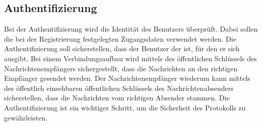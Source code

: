 \subsection{Authentifizierung}


Bei der Authentifizierung wird die Identität des Benutzers überprüft.
Dabei sollen die bei der Registrierung festgelegten Zugangsdaten verwendet werden. Die Authentifizierung 
soll sicherstellen, dass der Benutzer der ist, für den er sich ausgibt.
Bei einem Verbindungsaufbau wird mittels des öffentlichen Schlüssels des Nachrichtenempfängers sichergestellt,
dass die Nachrichten an den richtigen Empfänger gesendet werden. Der Nachrichtenempfänger wiederum kann
mittels des öffentlich einsehbaren öffentlichen Schlüssels des Nachrichtenabsenders sicherstellen, dass die
Nachrichten vom richtigen Absender stammen.
Die Authentifizierung ist ein wichtiger Schritt, um die Sicherheit des Protokolls zu gewährleisten.





